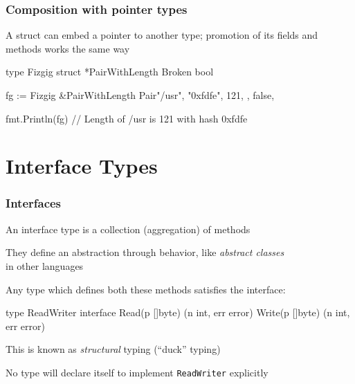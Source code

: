 \documentclass[handout,compress,t,11pt]{beamer}
\begin{document}
\begin{frame}[fragile]
    \frametitle{Composition with pointer types}
    A struct can embed a pointer to another type; promotion of its fields 
    and methods works the same way \par
\begin{golang}
type Fizgig struct {
    *PairWithLength
    Broken bool
}

fg := Fizgig{
    &PairWithLength{
        Pair{"/usr", "0xfdfe"}, 
        121,
    },
    false,
}

fmt.Println(fg)
// Length of /usr is 121 with hash 0xfdfe
\end{golang}
\end{frame}



\section{Interface Types}

\begin{frame}[fragile]
    \frametitle{Interfaces}
    An interface type is a collection (aggregation) of methods \par
    \vspace{\baselineskip}
    They define an abstraction through behavior, like {\em abstract classes}\\
    in other languages \par
    \vspace{0.4\baselineskip}
    Any type which defines both these methods satisfies the interface: \par
\begin{golang}
type ReadWriter interface {
    Read(p []byte) (n int, err error)
    Write(p []byte) (n int, err error)
}
\end{golang}
    \vspace{\baselineskip}
    This is known as {\em structural} typing (``duck'' typing) \par
    \vspace{0.4\baselineskip}
    No type will declare itself to implement \verb|ReadWriter| explicitly
\end{frame}
\end{document}
